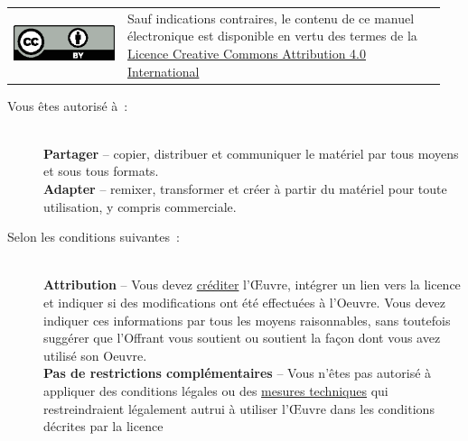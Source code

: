 \vfill
\begin{tcolorbox}[
	colback=white, 
	colframe=black,
	toprule=1pt,
	bottomrule=1pt,
	leftrule=1pt,
	rightrule=1pt,
	before upper={\begin{minipage}[t]{\linewidth}},
    after upper={\end{minipage}},
]
\begin{tabular}{m{0.25\linewidth}m{0.7\linewidth}}
\includegraphics{images/CC/by.eps} & 
Sauf indications contraires, le contenu de ce manuel électronique est disponible en vertu des termes de la \href{https://creativecommons.org/licenses/by/4.0/deed.fr}{Licence Creative Commons Attribution 4.0 International} \\
\end{tabular}

\begin{description}
  \item[Vous êtes autorisé à~:] ~\\
  \textbf{Partager} -- copier, distribuer et communiquer le matériel par tous moyens et sous tous formats.\\
  \textbf{Adapter} -- remixer, transformer et créer à partir du matériel pour toute utilisation, y compris commerciale.


\item[Selon les conditions suivantes~:] ~\\
  \textbf{Attribution} -- Vous devez \href{https://creativecommons.org/licenses/by/4.0/deed.fr\#}{créditer} l'Œuvre, intégrer un lien vers la licence et indiquer si des modifications ont été effectuées à l'Oeuvre. Vous devez indiquer ces informations par tous les moyens raisonnables, sans toutefois suggérer que l'Offrant vous soutient ou soutient la façon dont vous avez utilisé son Oeuvre.\\
  \textbf{Pas de restrictions complémentaires} -- Vous n'êtes pas autorisé à appliquer des conditions légales ou des \href{https://creativecommons.org/licenses/by/4.0/deed.fr\#}{mesures techniques} qui restreindraient légalement autrui à utiliser l'Œuvre dans les conditions décrites par la licence
\end{description}
\end{tcolorbox}

